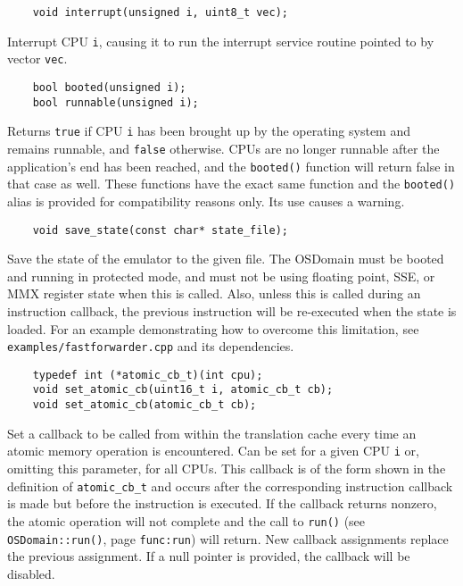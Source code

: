 \documentclass[letterpaper, 10pt]{book}
\begin{document}
\label{func:interrupt} \begin{verbatim}
    void interrupt(unsigned i, uint8_t vec);
\end{verbatim}
Interrupt CPU \texttt{i}, causing it to run the interrupt service routine
pointed to by vector \texttt{vec}.

\label{func:booted} \label{func:runnable} \begin{verbatim}
    bool booted(unsigned i);
    bool runnable(unsigned i);
\end{verbatim}
Returns \texttt{true} if CPU \texttt{i} has been brought up by the operating
system and remains runnable, and \texttt{false} otherwise. CPUs are no longer
runnable after the application's end has been reached, and the
\texttt{booted()} function will return false in that case as well. These
functions have the exact same function and the \texttt{booted()} alias is
provided for compatibility reasons only. Its use causes a warning.

\label{func:save_state} \begin{verbatim}
    void save_state(const char* state_file);
\end{verbatim}
Save the state of the emulator to the given file. The OSDomain must be booted
and running in protected mode, and must not be using floating point, SSE, or MMX
register state when this is called. Also, unless this is called during an
instruction callback, the previous instruction will be re-executed when the state
is loaded. For an example demonstrating how to overcome this limitation, see
\texttt{examples/fastforwarder.cpp} and its dependencies.

\label{func:set_atomic_cb} \begin{verbatim}
    typedef int (*atomic_cb_t)(int cpu);
    void set_atomic_cb(uint16_t i, atomic_cb_t cb);
    void set_atomic_cb(atomic_cb_t cb);
\end{verbatim}
Set a callback to be called from within the translation cache every time an
atomic memory operation is encountered. Can be set for a given CPU \texttt{i}
or, omitting this parameter, for all CPUs. This callback is of the form shown
in the definition of \texttt{atomic\_cb\_t} and occurs after the corresponding
instruction callback is made but before the instruction is executed. If the
callback returns nonzero, the atomic operation will not complete and the
call to \texttt{run()} (see \texttt{OSDomain::run()}, page \texttt{func:run})
will return. New callback assignments replace the previous assignment. If a
null pointer is provided, the callback will be disabled.
\end{document}
